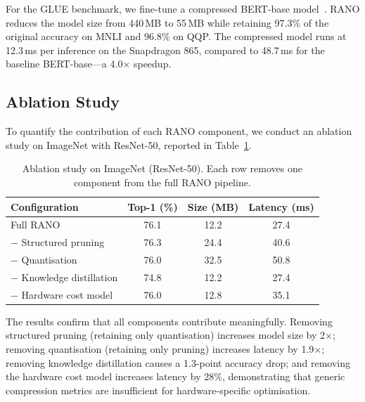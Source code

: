 \documentclass[12pt,a4paper,oneside]{book}
\begin{document}
For the GLUE benchmark, we fine-tune a compressed BERT-base
model~\cite{devlin2019bert}. RANO reduces the model size from 440\,MB to
55\,MB while retaining 97.3\% of the original accuracy on MNLI and
96.8\% on QQP. The compressed model runs at 12.3\,ms per inference on
the Snapdragon 865, compared to 48.7\,ms for the baseline
BERT-base---a 4.0$\times$ speedup.

\subsection{Ablation Study}

To quantify the contribution of each RANO component, we conduct an
ablation study on ImageNet with ResNet-50, reported in
Table~\ref{tab:ablation}.

\begin{table}[htbp]
\centering
\caption{Ablation study on ImageNet (ResNet-50). Each row removes one
component from the full RANO pipeline.}
\label{tab:ablation}
\begin{tabular}{@{}lccc@{}}
\toprule
\textbf{Configuration} & \textbf{Top-1 (\%)} & \textbf{Size (MB)} & \textbf{Latency (ms)} \\
\midrule
Full RANO                  & 76.1 & 12.2 & 27.4 \\
$-$ Structured pruning     & 76.3 & 24.4 & 40.6 \\
$-$ Quantisation           & 76.0 & 32.5 & 50.8 \\
$-$ Knowledge distillation & 74.8 & 12.2 & 27.4 \\
$-$ Hardware cost model    & 76.0 & 12.8 & 35.1 \\
\bottomrule
\end{tabular}
\end{table}

The results confirm that all components contribute meaningfully.
Removing structured pruning (retaining only quantisation) increases
model size by 2$\times$; removing quantisation (retaining only pruning)
increases latency by 1.9$\times$; removing knowledge distillation causes
a 1.3-point accuracy drop; and removing the hardware cost model
increases latency by 28\%, demonstrating that generic compression
metrics are insufficient for hardware-specific optimisation.

\newpage
\end{document}
